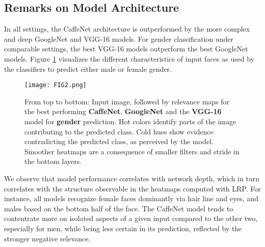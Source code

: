 \documentclass[10pt,twocolumn,letterpaper]{article}
\begin{document}
\subsection{Remarks on Model Architecture}
In all settings, the CaffeNet architecture is outperformed by the more complex and deep GoogleNet and VGG-16 models. For gender classification under comparable settings, the best VGG-16 models outperform the best GoogleNet models. Figure \ref{fig:howarchitecturesusefaces} visualizes the different characteristics of input faces as used by the classifiers to predict either male or female gender.

\begin{figure}
\begin{center}
\texttt{[image: FIG2.png]}
\end{center}
\caption{From top to bottom: Input image, followed by relevance maps for the best performing \textbf{CaffeNet}, \textbf{GoogleNet} and the \textbf{VGG-16} model for \textbf{gender} prediction.
Hot colors identify parts of the image contributing to the predicted class. Cold hues show evidence contradicting the predicted class, as perceived by the model. Smoother heatmaps are a consequence of smaller filters and stride in the bottom layers.}
\label{fig:howarchitecturesusefaces}
\end{figure}

We observe that model performance correlates with network depth, which in turn correlates with the structure observable in the heatmaps computed with LRP. For instance, all models recognize female faces dominantly via hair line and eyes, and males based on the bottom half of the face. The CaffeNet model tends to contentrate more on isolated aspects of a given input compared to the other two, especially for men, while being less certain in its prediction, reflected by the stronger negative relevance.
\end{document}
